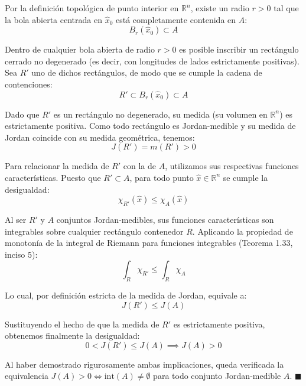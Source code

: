 \documentclass[11pt,letterpaper]{article}
\begin{document}
Por la definición topológica de punto interior en $\mathbb{R}^n$, existe un radio $r > 0$ tal que la bola abierta centrada en $\hat{x}_0$ está completamente contenida en $A$:
\begin{equation*}
B_r(\hat{x}_0) \subset A
\end{equation*}

Dentro de cualquier bola abierta de radio $r > 0$ es posible inscribir un rectángulo cerrado no degenerado (es decir, con longitudes de lados estrictamente positivas). Sea $R'$ uno de dichos rectángulos, de modo que se cumple la cadena de contenciones:
\begin{equation*}
R' \subset B_r(\hat{x}_0) \subset A
\end{equation*}

Dado que $R'$ es un rectángulo no degenerado, su medida (su volumen en $\mathbb{R}^n$) es estrictamente positiva. Como todo rectángulo es Jordan-medible y su medida de Jordan coincide con su medida geométrica, tenemos:
\begin{equation*}
J(R') = m(R') > 0
\end{equation*}

Para relacionar la medida de $R'$ con la de $A$, utilizamos sus respectivas funciones características. Puesto que $R' \subset A$, para todo punto $\hat{x} \in \mathbb{R}^n$ se cumple la desigualdad:
\begin{equation*}
\chi_{R'}(\hat{x}) \le \chi_A(\hat{x})
\end{equation*}

Al ser $R'$ y $A$ conjuntos Jordan-medibles, sus funciones características son integrables sobre cualquier rectángulo contenedor $R$. Aplicando la propiedad de monotonía de la integral de Riemann para funciones integrables (Teorema 1.33, inciso 5):
\begin{equation*}
\int_R \chi_{R'} \le \int_R \chi_A
\end{equation*}

Lo cual, por definición estricta de la medida de Jordan, equivale a:
\begin{equation*}
J(R') \le J(A)
\end{equation*}

Sustituyendo el hecho de que la medida de $R'$ es estrictamente positiva, obtenemos finalmente la desigualdad:
\begin{equation*}
0 < J(R') \le J(A) \implies J(A) > 0
\end{equation*}

\vspace{0.5cm}
Al haber demostrado rigurosamente ambas implicaciones, queda verificada la equivalencia $J(A) > 0 \iff \text{int}(A) \neq \emptyset$ para todo conjunto Jordan-medible $A$. \hfill $\blacksquare$
\end{document}

